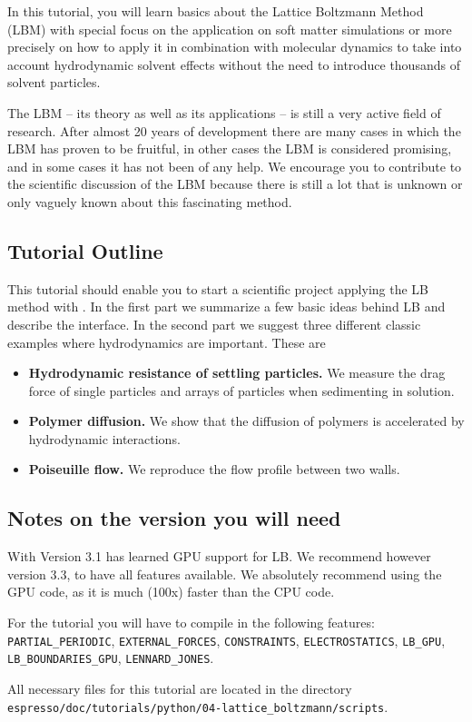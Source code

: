 In this tutorial, you will learn basics about the 
Lattice Boltzmann Method (LBM) with special focus on the application
on soft matter simulations or more precisely on how to apply it 
in combination with molecular dynamics to take into account 
hydrodynamic solvent effects without the need to introduce
thousands of solvent particles. 

The LBM -- its theory as well as its applications -- is 
still a very active field of research. After almost 20 years
of development there are many cases in which the LBM has proven
to be fruitful, in other cases the LBM is considered promising,
and in some cases it has not been of any help. We
encourage you to contribute to the scientific discussion 
of the LBM because there is still a lot 
that is unknown or only vaguely known about this fascinating
method. 

\subsection*{Tutorial Outline}
This tutorial should enable you to start a scientific project applying
the LB method with \ES{}. In the first part we summarize a few basic ideas behind LB 
and describe the interface. In the second part we suggest three
different classic examples where hydrodynamics are important. These are
\begin{itemize}
  \item \textbf{Hydrodynamic resistance of settling particles.} We measure the drag
   force of single particles and arrays of particles when sedimenting
   in solution.
  \item \textbf{Polymer diffusion.} We show that the diffusion of polymers is accelerated 
    by hydrodynamic interactions.
  \item \textbf{Poiseuille flow.} We reproduce the flow profile between two walls.
\end{itemize}

\subsection*{Notes on the \ES{} version you will need}
With Version 3.1 \ES{} has learned GPU support for LB. We recommend however
version 3.3, to have all features available. We absolutely recommend using 
the GPU code, as it is much (100x) faster than the CPU code.

For the tutorial you will have to compile in the following  features:
\texttt{PARTIAL\_PERIODIC}, \texttt{EXTERNAL\_FORCES}, \texttt{CONSTRAINTS}, \texttt{ELECTROSTATICS}, 
\texttt{LB\_GPU}, \texttt{LB\_BOUNDARIES\_GPU},  \texttt{LENNARD\_JONES}.

All necessary files for this tutorial are located in the directory
\texttt{espresso/doc/tutorials/python/04-lattice\_boltzmann/scripts}.
\pagebreak


